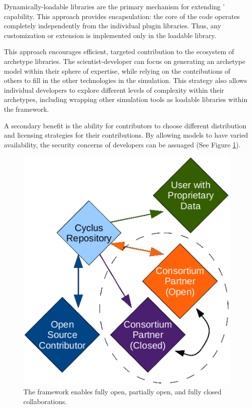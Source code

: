 Dynamically-loadable libraries are the primary mechanism for extending \Cyclus' capability. 
This approach provides encapsulation: the core of the code operates
completely independently from the individual plugin libraries. Thus, any
customization or extension is implemented only in the loadable
library. 

This approach encourages efficient, targeted contribution to the ecosystem of 
archetype libraries.  The 
scientist-developer can focus on generating an archetype model within their
sphere of expertise, while relying on the contributions of others to fill 
in the other technologies in the simulation.  This strategy also allows individual developers to
explore different levels of complexity within their archetypes, including
wrapping other simulation tools as loadable libraries within the \Cyclus
framework.

A secondary benefit is the ability for
contributors to choose different distribution and licensing strategies
for their contributions. By allowing models to have varied
availability, the security concerns of developers can be
assuaged (See Figure \ref{fig:modifiedopen}).

\begin{figure}[htbp!]
\begin{center}
\includegraphics{./images/modifiedopen.eps}
\end{center}
\caption{The \Cyclus framework enables fully open, partially open, and fully
closed collaborations\cite{wilson_cyclus:_2012}.}
\label{fig:modifiedopen}
\end{figure}

